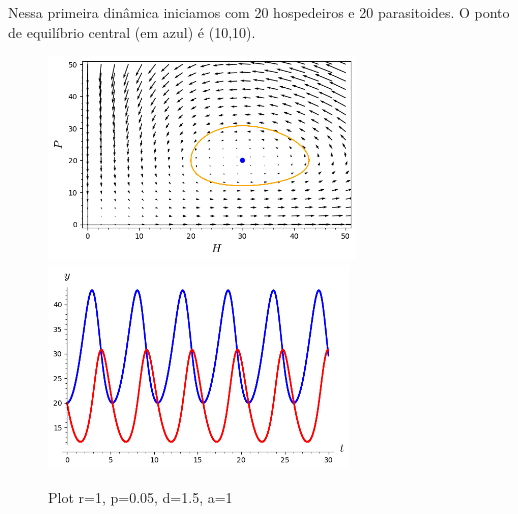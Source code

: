 	Nessa primeira dinâmica iniciamos com 20 hospedeiros e 20 parasitoides. O ponto de equilíbrio central (em azul) é (10,10).

	
\begin{figure}[h!]
\begin{center}
	\includegraphics[height=5.4cm]{Img/HP (r=1,p=0.05, d=1.5,a=1); (20, 20); (30, 20).png} \quad
	\includegraphics[height=5.4cm]{Img/T (r=1,p=0.05, d=1.5,a=1); (20, 20); (30, 20).png}
\caption{Plot r=1, p=0.05, d=1.5, a=1} \label{gdimotes}
\end{center}
\end{figure}


\newpage


